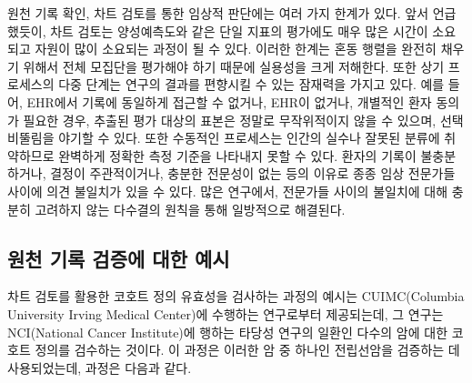 \documentclass[11pt]{book}
\theoremstyle{definition}
\theoremstyle{definition}
\theoremstyle{definition}
\theoremstyle{remark}
\begin{document}
원천 기록 확인, 차트 검토를 통한 임상적 판단에는 여러 가지 한계가 있다.
앞서 언급했듯이, 차트 검토는 양성예측도와 같은 단일 지표의 평가에도 매우
많은 시간이 소요되고 자원이 많이 소요되는 과정이 될 수 있다. 이러한
한계는 혼동 행렬을 완전히 채우기 위해서 전체 모집단을 평가해야 하기
때문에 실용성을 크게 저해한다. 또한 상기 프로세스의 다중 단계는 연구의
결과를 편향시킬 수 있는 잠재력을 가지고 있다. 예를 들어, EHR에서 기록에
동일하게 접근할 수 없거나, EHR이 없거나, 개별적인 환자 동의가 필요한
경우, 추출된 평가 대상의 표본은 정말로 무작위적이지 않을 수 있으며,
선택비뚤림을 야기할 수 있다. 또한 수동적인 프로세스는 인간의 실수나
잘못된 분류에 취약하므로 완벽하게 정확한 측정 기준을 나타내지 못할 수
있다. 환자의 기록이 불충분하거나, 결정이 주관적이거나, 충분한 전문성이
없는 등의 이유로 종종 임상 전문가들 사이에 의견 불일치가 있을 수 있다.
많은 연구에서, 전문가들 사이의 불일치에 대해 충분히 고려하지 않는
다수결의 원칙을 통해 일방적으로 해결된다.

\subsection{원천 기록 검증에 대한 예시}\label{----}

차트 검토를 활용한 코호트 정의 유효성을 검사하는 과정의 예시는
CUIMC(Columbia University Irving Medical Center)에 수행하는 연구로부터
제공되는데, 그 연구는 NCI(National Cancer Institute)에 행하는 타당성
연구의 일환인 다수의 암에 대한 코호트 정의를 검수하는 것이다. 이 과정은
이러한 암 중 하나인 전립선암을 검증하는 데 사용되었는데, 과정은 다음과
같다.
\end{document}

